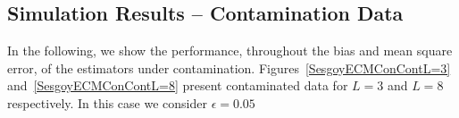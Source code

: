 \documentclass[twocolumn]{svjour3}
\begin{document}

\subsection{Simulation Results -- Contamination Data}
\label{CasesCont}

%
%
%
%
%
%
In the following, we show the performance, throughout the bias and mean square error, of the estimators under contamination. 
Figures~\ref{SesgoyECMConContL=3} and~\ref{SesgoyECMConContL=8} present contaminated data for $L=3$ and $L=8$ respectively. In this case we consider $\epsilon=0.05$
\end{document}
